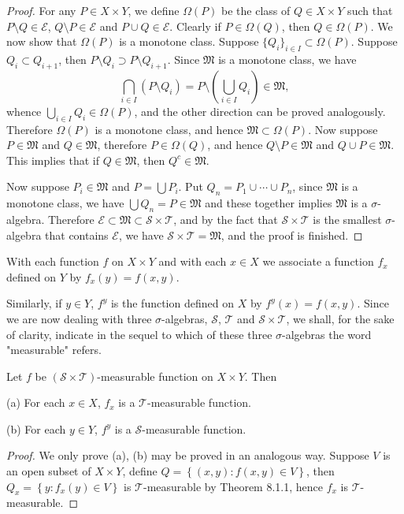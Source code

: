 \begin{proof}
For any $P\in X\times Y$, we define $\Omega(P)$ be the class of $Q\in X\times Y$ such that $P\setminus Q\in\mathscr{E}$, $Q\setminus P\in\mathscr{E}$ and $P\cup Q\in\mathscr{E}$. Clearly if $P\in\Omega(Q)$, then $Q\in\Omega(P)$. We now show that $\Omega(P)$ is a monotone class. Suppose $\{Q_i\}_{i\in I}\subset\Omega(P)$. Suppose $Q_i\subset Q_{i+1}$, then $P\setminus Q_i\supset P\setminus Q_{i+1}$. Since $\mathfrak{M}$ is a monotone class, we have 
$$
\bigcap_{i\in I}{\left( P\setminus Q_i \right)}=P\setminus \left( \bigcup_{i\in I}{Q_i} \right) \in \mathfrak{M} ,
$$
whence $\bigcup_{i\in I}Q_i\in\Omega(P)$, and the other direction can be proved analogously. Therefore $\Omega(P)$ is a monotone class, and hence $\mathfrak{M}\subset\Omega(P)$. Now suppose $P\in\mathfrak{M}$ and $Q\in\mathfrak{M}$, therefore $P\in\Omega(Q)$, and hence $Q\setminus P\in\mathfrak{M}$ and $Q\cup P\in\mathfrak{M}$. This implies that if $Q\in\mathfrak{M}$, then $Q^c\in\mathfrak{M}$.\par
Now suppose $P_i\in\mathfrak{M}$ and $P=\bigcup P_i$. Put $Q_n=P_1\cup\cdots\cup P_n$, since $\mathfrak{M}$ is a monotone class, we have $\bigcup Q_n=P\in\mathfrak{M}$ and these together implies $\mathfrak{M}$ is a $\sigma$-algebra. Therefore $\mathscr{E}\subset\mathfrak{M}\subset\mathscr{S}\times\mathscr{T}$, and by the fact that $\mathscr{S}\times\mathscr{T}$ is the smallest $\sigma$-algebra that contains $\mathscr{E}$, we have $\mathscr{S}\times\mathscr{T}=\mathfrak{M}$, and the proof is finished.
\end{proof}
With each function $f$ on $X\times Y$ and with each $x\in X$ we associate a function $f_x$ defined on $Y$ by $f_x(y)=f(x,y)$.\par
Similarly, if $y\in Y$, $f^y$ is the function defined on $X$ by $f^y(x)=f(x,y)$. Since we are now dealing with three $\sigma$-algebras, $\mathscr{S}$, $\mathscr{T}$ and $\mathscr{S}\times\mathscr{T}$, we shall, for the sake of clarity, indicate in the sequel to which of these three $\sigma$-algebras the word "measurable" refers.
\begin{theorem}
Let $f$ be $(\mathscr{S}\times\mathscr{T})$-measurable function on $X\times Y$. Then \par
(a) For each $x\in X$, $f_x$ is a $\mathscr{T}$-measurable function.\par
(b) For each $y\in Y$, $f^y$ is a $\mathscr{S}$-measurable function.
\end{theorem}
\begin{proof}
We only prove (a), (b) may be proved in an analogous way. Suppose $V$ is an open subset of $X\times Y$, define $Q=\left\{ \left( x,y \right) :f\left( x,y \right) \in V \right\} $, then $Q_x=\left\{ y:f_x\left( y \right) \in V \right\} $ is $\mathscr{T}$-measurable by Theorem 8.1.1, hence $f_x$ is $\mathscr{T}$-measurable.
\end{proof}
